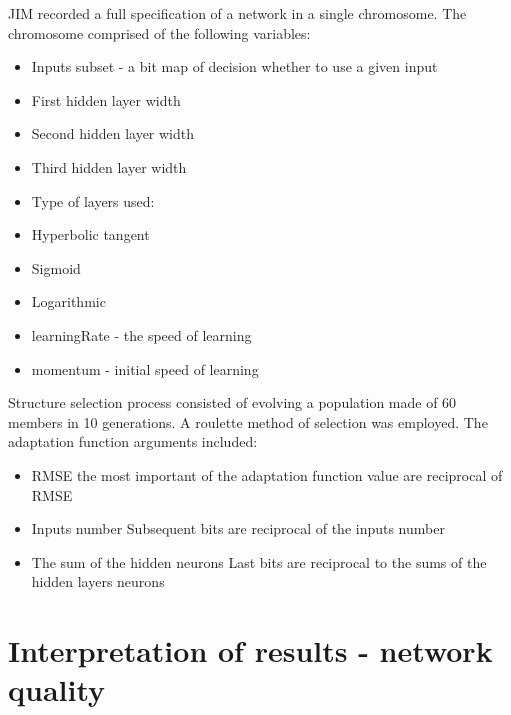 \documentclass[10pt,oneside]{memoir}
\begin{document}
JIM recorded a full specification of a network in a single chromosome. The chromosome comprised of the following variables:


\begin{itemize}


\item Inputs subset - a bit map of decision whether to use a given input

\item First hidden layer width

\item Second hidden layer width

\item Third hidden layer width

\item Type of layers used:

\item Hyperbolic tangent

\item Sigmoid

\item Logarithmic

\item learningRate - the speed of learning

\item momentum - initial speed of learning
\end{itemize}

Structure selection process consisted of evolving a population made of 60 members in 10 generations. A roulette method of selection was employed. The adaptation function arguments included:


\begin{itemize}


\item RMSE
the most important of the adaptation function value are reciprocal of RMSE

\item Inputs number
Subsequent bits are reciprocal of the inputs number

\item The sum of the hidden neurons
Last bits are reciprocal to the sums of the hidden layers neurons
\end{itemize}

\section{Interpretation of results - network quality}
\label{interpretationofresults-networkquality}
\end{document}
